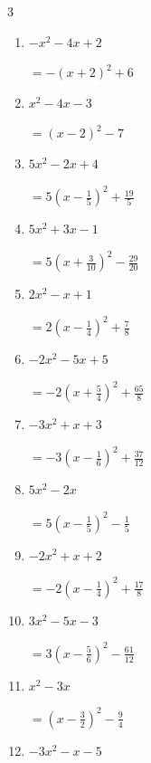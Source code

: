 \begin{multicols}{3}
\begin{enumerate}
\columnbreak %

\resetques

  \item $-x^{2}-4x+2$

        $\displaystyle =-\left( x+2\right)^{2}+6$

  \item $x^{2}-4x-3$

        $\displaystyle =\left( x-2\right)^{2}-7$

  \item $5x^{2}-2x+4$

        $\displaystyle =5\left( x-\frac{1}{5}\right)^{2}+\frac{19}{5}$

  \item $5x^{2}+3x-1$

        $\displaystyle =5\left( x+\frac{3}{10}\right)^{2}-\frac{29}{20}$

  \item $2x^{2}-x+1$

        $\displaystyle =2\left( x-\frac{1}{4}\right)^{2}+\frac{7}{8}$

\columnbreak %

  \item $-2x^{2}-5x+5$

        $\displaystyle =-2\left( x+\frac{5}{4}\right)^{2}+\frac{65}{8}$

  \item $-3x^{2}+x+3$

        $\displaystyle =-3\left( x-\frac{1}{6}\right)^{2}+\frac{37}{12}$

  \item $5x^{2}-2x$

        $\displaystyle =5\left( x-\frac{1}{5}\right)^{2}-\frac{1}{5}$

  \item $-2x^{2}+x+2$

        $\displaystyle =-2\left( x-\frac{1}{4}\right)^{2}+\frac{17}{8}$

  \item $3x^{2}-5x-3$

        $\displaystyle =3\left( x-\frac{5}{6}\right)^{2}-\frac{61}{12}$

\columnbreak %

  \item $x^{2}-3x$

        $\displaystyle =\left( x-\frac{3}{2}\right)^{2}-\frac{9}{4}$

  \item $-3x^{2}-x-5$


\end{enumerate}
\end{multicols}

